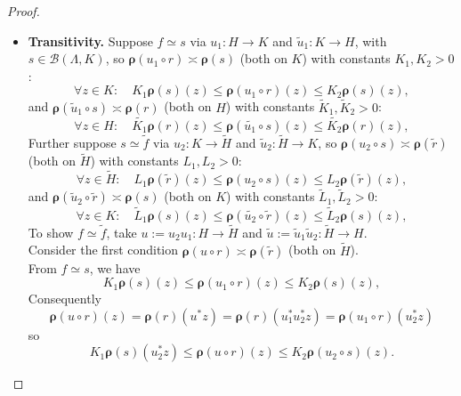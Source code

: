 \documentclass[a4paper,10pt]{article}
\theoremstyle{plain}
\theoremstyle{definition}
\theoremstyle{remark}
\begin{document}
\begin{proof}
\begin{itemize}
\begin{itemize}
                  The second condition is $\boldsymbol{\rho}(\tilde{v}\circ r)\asymp\boldsymbol{\rho}(\tilde{r})$, i.e., $\boldsymbol{\rho}(u\circ r)\asymp\boldsymbol{\rho}(\tilde{r})$, which also holds by assumption. \\
                  Hence, $\tilde{r}\simeq r$.
            \item \textbf{Transitivity.} Suppose $f\simeq s$ via $u_1:H\to K$ and $\tilde{u}_1:K\to H$, with $s\in \mathsf{\mathcal{B}}(\Lambda,K)$, so $\boldsymbol{\rho}(u_1\circ r)\asymp\boldsymbol{\rho}(s)$ (both on $K$) with constants $K_1,K_2>0$:
                  \[ \forall z\in K:\quad K_1\boldsymbol{\rho}(s)(z)\leq\boldsymbol{\rho}(u_1\circ r)(z)\leq K_2\boldsymbol{\rho}(s)(z), \]
                  and $\boldsymbol{\rho}(\tilde{u}_1\circ s)\asymp\boldsymbol{\rho}(r)$ (both on $H$) with constants $\tilde{K}_1,\tilde{K}_2>0$:
                  \[ \forall z \in H:\quad \tilde{K_1} \boldsymbol{\rho}(r)(z)\leq\boldsymbol{\rho}(\tilde{u_1}\circ s)(z)\leq \tilde{K_2} \boldsymbol{\rho}(r)(z), \]
                  Further suppose $s\simeq\tilde{f}$ via $u_2:K\to\tilde{H}$ and $\tilde{u}_2:\tilde{H}\to K$, so $\boldsymbol{\rho}(u_2\circ s)\asymp\boldsymbol{\rho}(\tilde{r})$ (both on $\tilde{H}$) with constants $L_1,L_2>0$:
                  \[ \forall z \in\tilde{H}:\quad L_1\boldsymbol{\rho}(\tilde{r})(z)\leq\boldsymbol{\rho}(u_2\circ s)(z)\leq L_2\boldsymbol{\rho}(\tilde{r})(z), \]
                  and $\boldsymbol{\rho}(\tilde{u}_2\circ\tilde{r})\asymp\boldsymbol{\rho}(s)$ (both on $K$) with constants $\tilde{L}_1,\tilde{L}_2>0$:
                  \[ \forall z \in K:\quad \tilde{L}_1\boldsymbol{\rho}(s)(z)\leq\boldsymbol{\rho}(\tilde{u_2} \circ \tilde{r})(z)\leq \tilde{L}_2\boldsymbol{\rho}(s)(z), \]
                  To show $f\simeq\tilde{f}$, take $u:=u_2u_1:H\to\tilde{H}$ and $\tilde{u}:=\tilde{u}_1\tilde{u}_2:\tilde{H}\to H$. \\
                  Consider the first condition $\boldsymbol{\rho}(u\circ r)\asymp\boldsymbol{\rho}(\tilde{r})$ (both on $\tilde{H}$). \\
                  From $f\simeq s$, we have
                  \[ K_1\boldsymbol{\rho}(s)(z)\leq\boldsymbol{\rho}(u_1\circ r)(z)\leq K_2\boldsymbol{\rho}(s)(z), \]
                  Consequently
                  \[ \boldsymbol{\rho}(u\circ r)(z) = \boldsymbol{\rho}(r)(u^* z) = \boldsymbol{\rho}(r)(u_1^* u_2^* z) =  \boldsymbol{\rho}(u_1 \circ r) (u_2^* z) \]
                  so
                  \[ K_1\boldsymbol{\rho}(s)(u_2^*z)\leq\boldsymbol{\rho}(u\circ r)(z)\leq K_2\boldsymbol{\rho}(u_2\circ s)(z). \]

\end{itemize}
\end{itemize}
\end{proof}
\end{document}
